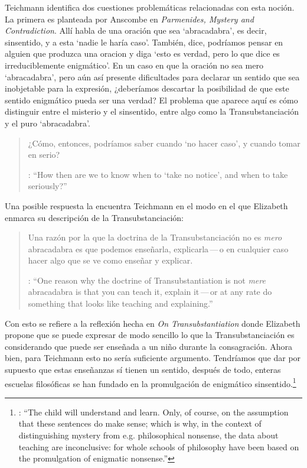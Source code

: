   Teichmann identifica dos cuestiones problemáticas relacionadas con esta noción. La primera es planteada por Anscombe en \emph{Parmenides, Mystery and Contradiction}. Allí habla de una oración que sea `abracadabra', es decir, sinsentido, y a esta \enquote*{nadie le haría caso}. También, dice, podríamos pensar en alguien que produzca una oracion y diga \enquote*{esto es verdad, pero lo que dice es irreduciblemente enigmático}. En un caso en que la oración no sea mero `abracadabra', pero aún así presente dificultades para declarar un sentido que sea inobjetable para la expresión, ¿deberíamos descartar la posibilidad de que este sentido enigmático pueda ser una verdad? El problema que aparece aquí es cómo distinguir entre el misterio y el sinsentido, entre algo como la Transubstanciación y el puro `abracadabra'. \blockquote[{\cite[213]{teichmann2008ans}}: \enquote{How then are we to know when to `take no notice', and when to take seriously?}]{¿Cómo, entonces, podríamos saber cuando `no hacer caso', y cuando tomar en serio?}

Una posible respuesta la encuentra Teichmann en el modo en el que Elizabeth enmarca su descripción de la Transubstanciación: \blockquote[{\cite[213]{teichmann2008ans}}: \enquote{One reason why the doctrine of Transubstantiation is not \emph{mere} abracadabra is that you can teach it, explain it\,---\,or at any rate do something that looks like teaching and explaining.}]{Una razón por la que la doctrina de la Transubstanciación no es \emph{mero} abracadabra es que podemos enseñarla, explicarla\,---\,o en cualquier caso hacer algo que se ve como enseñar y explicar.} Con esto se refiere a la reflexión hecha en \emph{On Transubstantiation} donde Elizabeth propone que se puede expresar de modo sencillo lo que la Transubstanciación es considerando que puede ser enseñada a un niño durante la consagración. Ahora bien, para Teichmann esto no sería suficiente argumento. Tendríamos que dar por supuesto que estas enseñanzas sí tienen un sentido, después de todo, enteras escuelas filosóficas se han fundado en la promulgación de enigmático sinsentido.\footnote{\cite[Cf.~][213]{teichmann2008ans}: \enquote{The child will understand and learn. Only, of course, on the assumption that these sentences do make sense; which is why, in the context of distinguishing mystery from e.g. philosophical nonsense, the data about teaching are inconclusive: for whole schools of philosophy have been based on the promulgation of enigmatic nonsense.}}

